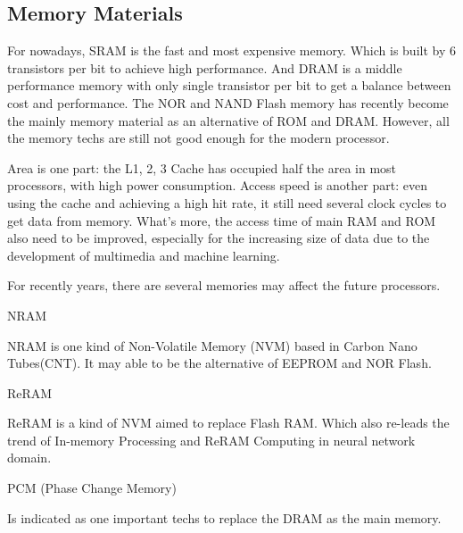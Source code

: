 \subsection{Memory Materials}
\par For nowadays, SRAM is the fast and most expensive memory. Which is built by 6 transistors per bit to achieve high performance. And DRAM is a middle performance memory with only single transistor per bit to get a balance between cost and performance. The NOR and NAND Flash memory has recently become the mainly memory material as an alternative of ROM and DRAM. However, all the memory techs are still not good enough for the modern processor.
\par Area is one part: the L1, 2, 3 Cache has occupied half the area in most processors, with high power consumption. Access speed is another part: even using the cache and achieving a high hit rate, it still need several clock cycles to get data from memory. What's more, the access time of main RAM and ROM also need to be improved, especially for the increasing size of data due to the development of multimedia and machine learning.  
\par For recently years, there are several memories may affect the future processors.
\par NRAM\cite{nantero2018NRAM}
\par NRAM is one kind of Non-Volatile Memory (NVM) based in Carbon Nano Tubes(CNT). It may able to be the alternative of EEPROM and NOR Flash.
\par ReRAM
\par ReRAM is a kind of NVM aimed to replace Flash RAM. Which also re-leads the trend of In-memory Processing and ReRAM Computing in neural network domain\cite{chi2016prime}.
\par PCM (Phase Change Memory)
\par Is indicated as one important techs to replace the DRAM as the main memory\cite{qureshi2009scalable}.
